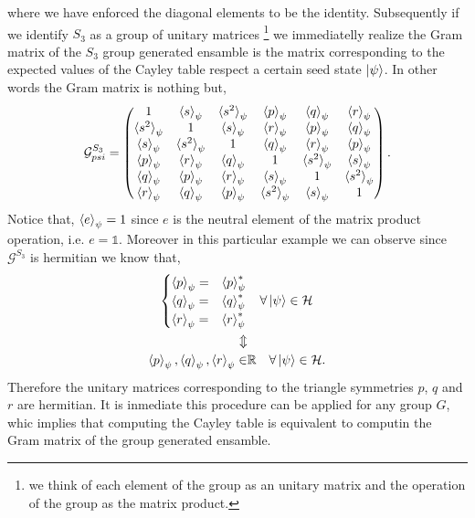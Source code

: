 \documentclass[12pt,letterpaper]{article}
\begin{document}
\begin{multicols}{2}
where we have enforced the diagonal elements to be the identity. Subsequently if we identify $S_3$ as a group of unitary matrices \footnote{we think of each element of the group as an unitary matrix and the operation of the group as the matrix product.} we immediatelly realize the Gram matrix of the $S_3$ group generated ensamble is the matrix corresponding to the expected values of the Cayley table respect a certain seed state $\ket{\psi}$. In other words the Gram matrix is nothing but,
\begin{align*}
	\mathcal{G}^{S_3}_{psi}=\begin{pmatrix}
        1 & \braket{s}_\psi & \braket{s^2}_\psi & \braket{p}_\psi & \braket{q}_\psi & \braket{r}_\psi \\ 
        \braket{s^2}_\psi & 1 & \braket{s}_\psi & \braket{r}_\psi & \braket{p}_\psi & \braket{q}_\psi \\
        \braket{s}_\psi & \braket{s^2}_\psi & 1 & \braket{q}_\psi & \braket{r}_\psi & \braket{p}_\psi \\
        \braket{p}_\psi & \braket{r}_\psi & \braket{q}_\psi & 1 & \braket{s^2}_\psi & \braket{s}_\psi \\
        \braket{q}_\psi & \braket{p}_\psi & \braket{r}_\psi & \braket{s}_\psi & 1 & \braket{s^2}_\psi \\
        \braket{r}_\psi & \braket{q}_\psi & \braket{p}_\psi & \braket{s^2}_\psi & \braket{s}_\psi & 1
	\end{pmatrix}.
\end{align*}
Notice that, $\braket{e}_\psi=1$ since $e$ is the neutral element of the matrix product operation, i.e. $e=\mathds{1}$. Moreover in this particular example we can observe since $\mathcal{G}^{S_3}$ is hermitian we know that,
\begin{align*}\begin{cases}
	\braket{p}_{\psi}=&\braket{p}_{\psi}^*\\
	\braket{q}_{\psi}=&\braket{q}_{\psi}^*\\
\braket{r}_{\psi}=&\braket{r}_{\psi}^*\end{cases}&\quad \forall \ket{\psi}\in \mathcal{H}\\
\Updownarrow& \\
\braket{p}_{\psi},\braket{q}_{\psi},\braket{r}_{\psi}\in&\mathbb{R}\quad \forall \ket{\psi}\in \mathcal{H}.
\end{align*}
Therefore the unitary matrices corresponding to the triangle symmetries $p$, $q$ and $r$ are hermitian. It is inmediate this procedure can be applied for any group $G$, whic implies that computing the Cayley table is equivalent to computin the Gram matrix of the group generated ensamble.


\end{multicols}
\end{document}
